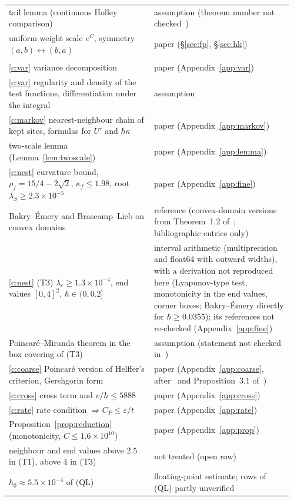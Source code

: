 \documentclass[11pt,a4paper]{article}
\theoremstyle{definition}
\theoremstyle{remark}
\newcommand{\hk}{\hbar\kappa}
\begin{document}
\begin{table}[!htbp]
\begin{tabular}{@{}>{\raggedright\arraybackslash}p{0.49\linewidth}>{\raggedright\arraybackslash}p{0.47\linewidth}@{}}
tail lemma (continuous Holley comparison) & assumption (theorem number not checked~\cite{Ho})\\
uniform weight scale $e^{C}$, symmetry $(a,b)\leftrightarrow(b,a)$ & paper (\S\ref{sec:fp}, \S\ref{sec:hk})\\\midrule
\multicolumn{2}{@{}l}{\emph{The construction of \S\ref{sec:construction} (valid for $\hbar\in(0,0.2]$)}}\\
\ref{c:var} variance decomposition & paper (Appendix~\ref{app:var})\\
\ref{c:var} regularity and density of the test functions, differentiation under the integral & assumption\\
\ref{c:markov} nearest-neighbour chain of kept sites, formulas for $U'$ and $\hk$ & paper (Appendix~\ref{app:markov})\\
two-scale lemma (Lemma~\ref{lem:twoscale}) & paper (Appendix~\ref{app:lemma})\\
\ref{c:nest} curvature bound, $\rho_f=15/4-2\sqrt2$, $\kappa_f\le1.98$, root $\lambda_S\ge2.3\times10^{-5}$ & paper (Appendix~\ref{app:fine})\\
Bakry--Émery and Brascamp--Lieb on convex domains & reference (convex-domain versions from Theorem~1.2 of~\cite{KM}; \cite{BE,BL} bibliographic entries only)\\
\ref{c:nest} (T3) $\lambda_c\ge1.3\times10^{-4}$, end values $[0,4]^2$, $\hbar\in(0,0.2]$ & interval arithmetic (multiprecision and float64 with outward widths), with a derivation not reproduced here (Lyapunov-type test, monotonicity in the end values, corner boxes; Bakry--Émery directly for $\hbar\ge0.0355$); its references not re-checked (Appendix~\ref{app:fine})\\
Poincaré--Miranda theorem in the box covering of (T3) & assumption (statement not checked in~\cite{Ku})\\
\ref{c:coarse} Poincaré version of Helffer's criterion, Gershgorin form & paper (Appendix~\ref{app:coarse}, after~\cite{He} and Proposition~3.1 of~\cite{Le})\\
\ref{c:cross} cross term and $v/\hbar\le5888$ & paper (Appendix~\ref{app:cross})\\
\ref{c:rate} rate condition $\Rightarrow C_P\le\varepsilon/t$ & paper (Appendix~\ref{app:rate})\\
Proposition~\ref{prop:reduction} (monotonicity, $C\le1.6\times10^{10}$) & paper (Appendix~\ref{app:prop})\\
neighbour and end values above $2.5$ in (T1), above $4$ in (T3) & not treated (open row)\\\midrule
$\hbar_0\approx5.5\times10^{-4}$ of (QL) & floating-point estimate; rows of (QL) partly unverified\\\bottomrule
\end{tabular}
\end{table}
\end{document}
